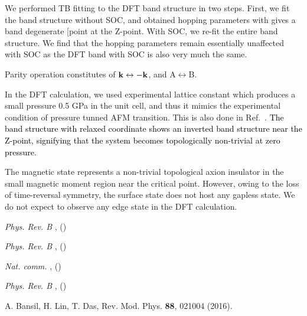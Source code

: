 \documentclass[aps,prl,showpacs,twocolumn,groupedaddress]{revtex4-1}
\newcommand{\blue}{\textcolor{black}}
\begin{document}
\begin{thebibliography}{1}
      We performed TB fitting to the DFT band structure in two steps. First, we fit the band structure without SOC, and obtained hopping parameters with gives a band degenerate [point at the Z-point. With SOC, we re-fit the entire band structure. We find that the hopping parameters remain essentially unaffected with SOC as the DFT band with SOC is also very much the same.

        Parity operation constitutes of ${\bf k}\leftrightarrow -{\bf k}$, and A$\leftrightarrow$B. 

       In the DFT calculation, we used experimental lattice constant which produces a  small pressure 0.5 GPa in the unit cell, and thus it mimics the experimental condition of pressure tunned AFM transition. This is also done in Ref.~\cite{LMTODFT}. \blue{The band structure with relaxed coordinate shows an inverted band structure near the Z-point, signifying that the system becomes topologically non-trivial at zero pressure}. 

       The magnetic state represents a non-trivial topological axion insulator in the small magnetic moment region near the critical point. However, owing to the loss of time-reversal symmetry, the surface state does not host any gapless state. We do not expect to observe any edge state in the DFT calculation.  

    \newblock \emph{ {Phys. Rev. B}}
    \textbf{},  ()
    
    
    \newblock \emph{ {Phys. Rev. B}}
    \textbf{},  ()

	
	\newblock \emph{ {Nat. comm.}}
	\textbf{},  ()
	
	\newblock \emph{ {Phys. Rev. B}}
	\textbf{},  ()
	
       A. Bansil, H. Lin, T. Das, Rev. Mod. Phys. {\bf 88}, 021004 (2016).


\end{thebibliography}
\end{document}
